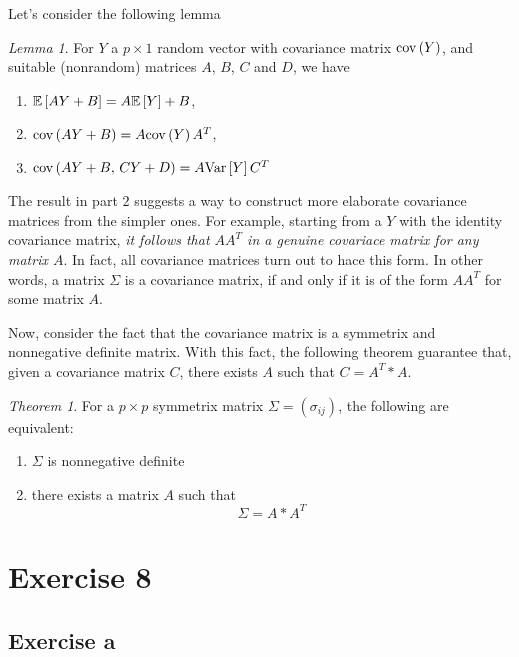 \documentclass[11pt]{article}
\theoremstyle{definition}
\theoremstyle{remark}
\theoremstyle{remark}
\theoremstyle{remark}
\newtheorem{theorem}{Theorem}[section]
\theoremstyle{proof}
\newtheorem{lemma}{Lemma}
\begin{document}
Let's consider the following lemma

\begin{lemma}
  For $Y$ a $p \times 1$ random vector with covariance matrix $\cov{Y}$, and
  suitable (nonrandom) matrices $A$, $B$, $C$ and $D$, we have
\begin{enumerate}
  \item $\E{AY + B} = A\E{Y} +B$,
  \item $\cov{AY + B} = A\cov{Y}A^{T}$,
  \item $\cov{AY + B, \,CY + D} = A\V{Y}C^{T}$
\end{enumerate}
\end{lemma}

The result in part $2$ suggests a way to construct more elaborate covariance
matrices from the simpler ones. For example, starting from a $Y$ with the
identity covariance matrix, \textit{it follows that $AA^{T}$ in a genuine
  covariace matrix for any matrix $A$}. In fact, all covariance matrices turn
out to hace this form. In other words, a matrix $\Sigma$ is a covariance matrix,
if and only if it is of the form $AA^{T}$ for some matrix $A$.

Now, consider the fact that the covariance matrix is a symmetrix and nonnegative
definite matrix. With this fact, the following theorem guarantee that, given a
covariance matrix $C$, there exists $A$ such that $C = A^{T}*A$.

\begin{theorem}
  For a $p \times p$ symmetrix matrix $\Sigma = (\sigma_{ij})$, the following
  are equivalent:
\begin{enumerate}
  \item $\Sigma$ is nonnegative definite
  \item there exists a matrix $A$ such that
    \[
    \Sigma = A*A^{T}
    \]
\end{enumerate}
\end{theorem}

\section*{Exercise 8}
\subsection*{Exercise a}
\end{document}
